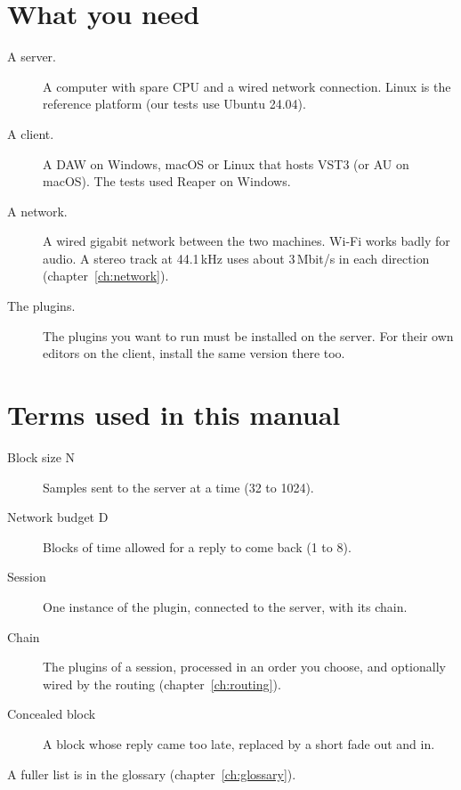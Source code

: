 \section{What you need}

\begin{description}
  \item[A server.] A computer with spare CPU and a wired network
    connection. Linux is the reference platform (our tests use Ubuntu
    24.04).
  \item[A client.] A DAW on Windows, macOS or Linux that hosts VST3 (or AU on
    macOS). The tests used Reaper on Windows.
  \item[A network.] A wired gigabit network between the two machines.
    Wi-Fi works badly for audio. A stereo track at 44.1\,kHz uses about
    3\,Mbit/s in each direction (chapter~\ref{ch:network}).
  \item[The plugins.] The plugins you want to run must be installed on the
    server. For their own editors on the client, install the same version
    there too.
\end{description}

\section{Terms used in this manual}

\begin{description}
  \item[Block size N] Samples sent to the server at a time (32 to 1024).
  \item[Network budget D] Blocks of time allowed for a reply to come back (1
    to 8).
  \item[Session] One instance of the  plugin, connected to the
    server, with its chain.
  \item[Chain] The plugins of a session, processed in an order you choose,
    and optionally wired by the routing (chapter~\ref{ch:routing}).
  \item[Concealed block] A block whose reply came too late, replaced by a
    short fade out and in.
\end{description}

A fuller list is in the glossary (chapter~\ref{ch:glossary}).
